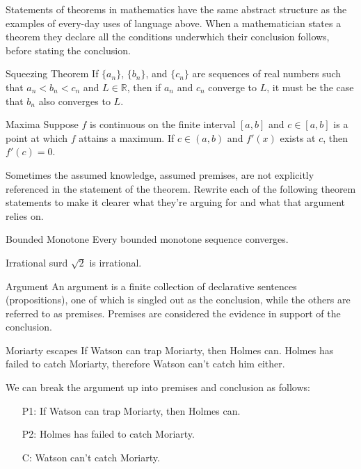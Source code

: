 \documentclass{book}
\begin{document}
Statements of theorems in mathematics have the same abstract structure as the examples of every-day uses of language above. When a mathematician states a theorem they declare all the conditions underwhich their conclusion follows, before stating the conclusion. 

\begin{eg}{Squeezing Theorem}
    If $\{a_{n}\}$, $\{b_{n}\}$, and $\{c_{n}\}$ are sequences of real numbers such that $a_{n} < b_{n} < c_{n}$ and $L \in \mathbb{R}$, then if $a_{n}$ and $c_{n}$ converge to $L$, it must be the case that $b_{n}$ also converges to $L$. 
\end{eg}

\begin{eg}{Maxima}
Suppose $f$ is continuous on the finite interval $[a,b]$ and $c \in [a,b]$ is a point at which $f$ attains a maximum. If $c \in (a,b)$ and $f'(x)$ exists at $c$, then $f'(c) = 0$. 
\end{eg}

Sometimes the assumed knowledge, assumed premises, are not explicitly referenced in the statement of the theorem. Rewrite each of the following theorem statements to make it clearer what they're arguing for and what that argument relies on. 

\begin{eg}{Bounded Monotone}
    Every bounded monotone sequence converges.
\end{eg}

\begin{eg}{Irrational surd}
    $\sqrt{2}$ is irrational.
\end{eg}



\begin{defn}{Argument}
    An argument is a finite collection of declarative sentences (propositions), one of which is singled out as the conclusion, while the others are referred to as premises. Premises are considered the evidence in support of the conclusion.
\end{defn}

\begin{eg}{Moriarty escapes}
    If Watson can trap Moriarty, then Holmes can. Holmes has failed to catch Moriarty, therefore Watson can't catch him either. 

    We can break the argument up into premises and conclusion as follows: 

    \begin{itemize}
        \item[P1:] If Watson can trap Moriarty, then Holmes can.
        \item[P2:] Holmes has failed to catch Moriarty.
        \item[C:] Watson can't catch Moriarty. 
    \end{itemize}
\end{eg}
\end{document}

